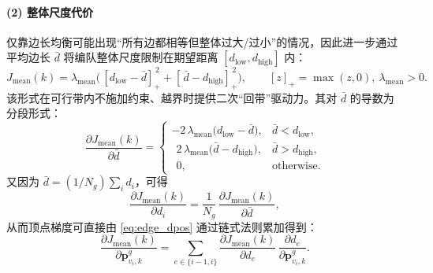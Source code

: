 \paragraph{(2) 整体尺度代价}
仅靠边长均衡可能出现“所有边都相等但整体过大/过小”的情况，因此进一步通过平均边长 \(\bar d\) 将编队整体尺度限制在期望距离 \([d_{\mathrm{low}},d_{\mathrm{high}}]\) 内：
\begin{equation}
\label{eq:J_mean}
J_{\mathrm{mean}}(k)
=\lambda_{\mathrm{mean}}\Big(\,[d_{\mathrm{low}}-\bar d]_+^{\,2}+[\,\bar d-d_{\mathrm{high}}]_+^{\,2}\Big),
\qquad [z]_+=\max(z,0),\ \lambda_{\mathrm{mean}}>0.
\end{equation}
该形式在可行带内不施加约束、越界时提供二次“回带”驱动力。其对 \(\bar d\) 的导数为分段形式：
\begin{equation}
\label{eq:J_mean_dbard}
\frac{\partial J_{\mathrm{mean}}(k)}{\partial \bar d}=
\begin{cases}
-2\,\lambda_{\mathrm{mean}}\big(d_{\mathrm{low}}-\bar d\big),& \bar d<d_{\mathrm{low}},\\[2pt]
\ \ 2\,\lambda_{\mathrm{mean}}\big(\bar d-d_{\mathrm{high}}\big),& \bar d>d_{\mathrm{high}},\\[2pt]
\ \ 0,& \text{otherwise}.
\end{cases}
\end{equation}
又因为 \(\bar d=(1/N_g)\sum_i d_i\)，可得
\begin{equation}
\label{eq:J_mean_dk}
\frac{\partial J_{\mathrm{mean}}(k)}{\partial d_i}
=\frac{1}{N_g}\,\frac{\partial J_{\mathrm{mean}}(k)}{\partial \bar d},
\end{equation}
从而顶点梯度可直接由 \eqref{eq:edge_dpos} 通过链式法则累加得到：
\begin{equation}
\label{eq:J_mean_grad_pos}
\frac{\partial J_{\mathrm{mean}}(k)}{\partial \mathbf{p}^{g}_{v_i,k}}
=\sum_{e\in\{i-1,i\}}\frac{\partial J_{\mathrm{mean}}(k)}{\partial d_e}\,
\frac{\partial d_e}{\partial \mathbf{p}^{g}_{v_i,k}}.
\end{equation}

